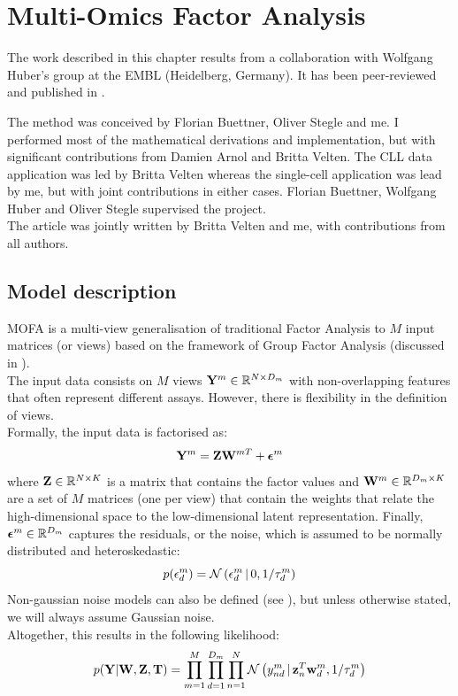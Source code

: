 \graphicspath{{Chapter2/Figs/}}

\section{Multi-Omics Factor Analysis}

The work described in this chapter results from a collaboration with Wolfgang Huber's group at the EMBL (Heidelberg, Germany). It has been peer-reviewed and published in \cite{Argelaguet2018}.

The method was conceived by Florian Buettner, Oliver Stegle and me. I performed most of the mathematical derivations and implementation, but with significant contributions from Damien Arnol and Britta Velten. The CLL data application was led by Britta Velten whereas the single-cell application was lead by me, but with joint contributions in either cases. Florian Buettner, Wolfgang Huber and Oliver Stegle supervised the project.\\
The article was jointly written by Britta Velten and me, with contributions from all authors.


\subsection{Model description} \label{mofa:model_description}
MOFA is a multi-view generalisation of traditional Factor Analysis to $M$ input matrices (or views) based on the framework of Group Factor Analysis (discussed in ).\\
The input data consists on $M$ views ${\bf Y}^m \in \mathbb{R}^{N \times D_m}$ with non-overlapping features that often represent different assays. However, there is flexibility in the definition of views.\\
Formally, the input data is factorised as:
\begin{equation} \label{mofa_master_equation}
	\mathbf{Y}^m = \mathbf{Z}\mathbf{W}^{mT} + \mbox{\boldmath $\epsilon$}^m
\end{equation}
where ${\bf Z} \in \mathbb{R}^{N \times K}$ is a matrix that contains the factor values and ${\bf W}^m \in \mathbb{R}^{D_m \times K}$ are a set of $M$ matrices (one per view) that contain the weights that relate the high-dimensional space to the low-dimensional latent representation. Finally, $\mbox{\boldmath $\epsilon$}^m \in \mathbb{R}^{D_m}$ captures the residuals, or the noise, which is assumed to be normally distributed and heteroskedastic:
\begin{equation}
	p(\epsilon^m_d) = \mathcal{N}\left(\epsilon^m_d \,|\, 0,1/\tau_d^m\right)
\end{equation}
Non-gaussian noise models can also be defined (see ), but unless otherwise stated, we will always assume Gaussian noise.\\
Altogether, this results in the following likelihood:
\begin{equation}
	p({\bf Y}|{\bf W},{\bf Z},\mbox{\boldmath $\mathrm{T}$}) = \prod_{m=1}^{M} \prod_{d=1}^{D_m} \prod_{n=1}^{N} \mathcal{N}\left(y_{nd}^m \,|\, {\bf z}_{n}^T{\bf w}_{d}^{m},1/\tau_d^m\right)
\end{equation}


